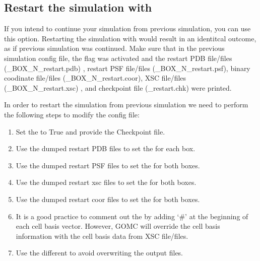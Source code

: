 \documentclass[letterpaper,10pt,english]{sphinxmanual}
\begin{document}
\subsection{Restart the simulation with }
\label{\detokenize{howto:restart-the-simulation-with-checkpoint}}
\sphinxAtStartPar
If you intend to continue your simulation from previous simulation, you can use this option. Restarting the simulation with  would result in an
identitcal outcome, as if previous simulation was continued.
Make sure that in the previous simulation config file, the flag  was activated and the restart PDB file/files (\_BOX\_N\_restart.pdb)
, restart PSF file/files (\_BOX\_N\_restart.psf), binary coodinate file/files (\_BOX\_N\_restart.coor), XSC file/files (\_BOX\_N\_restart.xsc) , and checkpoint file (\_restart.chk) were printed.

\sphinxAtStartPar
In order to restart the simulation from previous simulation we need to perform the following steps to modify the config file:
\begin{enumerate}
%
\item {} 
\sphinxAtStartPar
Set the  to True and provide the Checkpoint file.

\item {} 
\sphinxAtStartPar
Use the dumped restart PDB files to set the  for each box.

\item {} 
\sphinxAtStartPar
Use the dumped restart PSF files to set the  for both boxes.

\item {} 
\sphinxAtStartPar
Use the dumped restart xsc files to set the  for both boxes.

\item {} 
\sphinxAtStartPar
Use the dumped restart coor files to set the  for both boxes.

\item {} 
\sphinxAtStartPar
It is a good practice to comment out the  by adding ‘\#’ at the beginning of each cell basis vector. However, GOMC will override
the cell basis information with the cell basis data from XSC file/files.

\item {} 
\sphinxAtStartPar
Use the different  to avoid overwriting the output files.

\end{enumerate}
\end{document}
